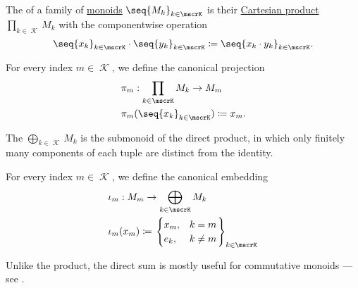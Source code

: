 \begin{definition}\label{def:monoid_direct_product}
  The  of a family of \hyperref[def:monoid]{monoids} \( \seq{ M_k }_{k \in \mscrK} \) is their \hyperref[def:cartesian_product]{Cartesian product} \( \prod_{k \in \mscrK} M_k \) with the componentwise operation
  \begin{equation*}
    \seq{ x_k }_{k \in \mscrK} \cdot \seq{ y_k }_{k \in \mscrK}
    \coloneqq
    \seq{ x_k \cdot y_k }_{k \in \mscrK}.
  \end{equation*}

  For every index \( m \in \mscrK \), we define the canonical projection
  \begin{equation*}
    \begin{aligned}
      &\pi_m: \prod_{k \in \mscrK} M_k \to M_m \\
      &\pi_m(\seq{ x_k }_{k \in \mscrK}) \coloneqq x_m.
    \end{aligned}
  \end{equation*}

  The  \( \bigoplus_{k \in \mscrK} M_k \) is the submonoid of the direct product, in which only finitely many components of each tuple are distinct from the identity.

  For every index \( m \in \mscrK \), we define the canonical embedding
  \begin{equation*}
    \begin{aligned}
       &\iota_m: M_m \to \bigoplus_{k \in \mscrK} M_k \\
       &\iota_m(x_m) \coloneqq
        \begin{rcases}
          \begin{cases}
            x_m, &k = m \\
            e_k, &k \neq m
          \end{cases}
        \end{rcases}_{k \in \mscrK}
    \end{aligned}
  \end{equation*}

  Unlike the product, the direct sum is mostly useful for commutative monoids --- see .
\end{definition}

